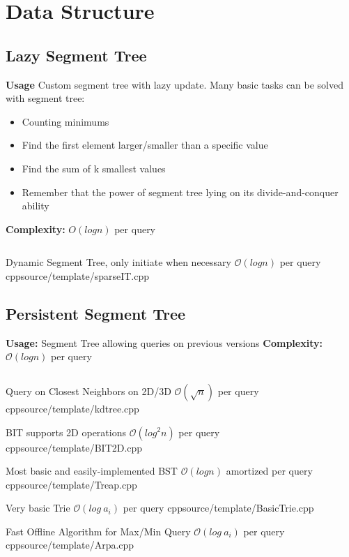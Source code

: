 \section{Data Structure}

\subsection{Lazy Segment Tree}

\textbf{Usage} Custom segment tree with lazy update. Many basic tasks can be solved with segment tree:  
\begin{itemize}
\item Counting minimums
\item Find the first element larger/smaller than a specific value 
\item Find the sum of k smallest values
\item Remember that the power of segment tree lying on its divide-and-conquer ability
\end{itemize}
\textbf{Complexity: }$O(log n)$ per query
\inputminted[]{cpp}{source/template/customIT.cpp}

{Dynamic Segment Tree, only initiate when necessary}
{$\mathcal{O}(log n)$ per query}
{cpp}{source/template/sparseIT.cpp}


\subsection{Persistent Segment Tree}
{\textbf{Usage: }Segment Tree allowing queries on previous versions}
{\textbf{Complexity: }$\mathcal{O}(log n)$ per query}
\inputminted[]{cpp}{source/template/PersistentSegtree.cpp}



{Query on Closest Neighbors on 2D/3D}
{$\mathcal{O}(\sqrt  n)$ per query}
{cpp}{source/template/kdtree.cpp}


{BIT supports 2D operations}
{$\mathcal{O}(log^2 n)$ per query}
{cpp}{source/template/BIT2D.cpp}


{Most basic and easily-implemented BST}
{$\mathcal{O}(log n)$ amortized per query}
{cpp}{source/template/Treap.cpp}


{Very basic Trie}
{$\mathcal{O}(log \ a_i)$ per query}
{cpp}{source/template/BasicTrie.cpp}


{Fast Offline Algorithm for Max/Min Query}
{$\mathcal{O}(log \ a_i)$ per query}
{cpp}{source/template/Arpa.cpp}


